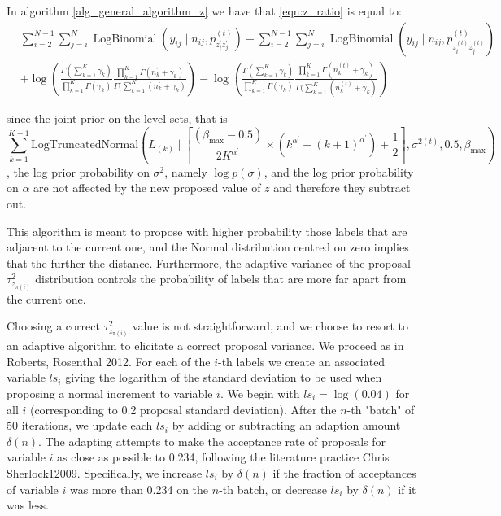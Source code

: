 \documentclass[11pt]{amsart}
\begin{document}
In algorithm \eqref{alg_general_algorithm_z} we have that \eqref{eqn:z_ratio} is equal to:
\begin{align}
&\sum_{i =2 }^{N-1} \sum_{j =i}^{N} \operatorname{LogBinomial}\left(y_{ij} \mid n_{ij}, p^{(t)}_{z^{\prime}_i z^{\prime}_j} \right)- \sum_{i =2 }^{N-1} \sum_{j =i}^{N} \operatorname{LogBinomial}\left( y_{ij} \mid n_{ij}, p^{(t)}_{z^{(t)}_i z^{(t)}_j} \right) \\&+  \log{ \left(\frac{\Gamma(\sum_{k=1}^K \gamma_k)}{\prod_{k=1}^K \Gamma(\gamma_k)}\frac{\prod_{k=1}^K \Gamma(n^{\prime}_k+\gamma_k)}{\Gamma(\sum_{k=1}^K (n^{\prime}_k+\gamma_k)} \right) } 
- \log{\left( \frac{\Gamma(\sum_{k=1}^K \gamma_k)}{\prod_{k=1}^K \Gamma(\gamma_k)}\frac{\prod_{k=1}^K \Gamma(n^{(t)}_k+\gamma_k)}{\Gamma(\sum_{k=1}^K (n^{(t)}_k+\gamma_k)} \right)}
\end{align}

since the joint prior on the level sets, that is $$ \sum_{k=1}^{K-1} \text{LogTruncatedNormal} \left(L_{(k)} \mid  \left[ \frac{(\beta_{\max} - 0.5)}{2K^{\alpha^{\prime}}} \times  \left(  k^{\alpha^{\prime}} + (k+1)^{\alpha^{\prime}} \right) +\frac{1}{2} \right], \sigma^{2(t)}, 0.5, \beta_{\max}\right)$$, the log prior probability on $\sigma^2$, namely $\log{p\left(\sigma \right)}$, and the log prior probability on $\alpha$ are not affected by the new proposed value of $z$ and therefore they subtract out.

This algorithm is meant to propose with higher probability those labels that are adjacent to the current one, and the Normal distribution centred on zero implies that the further the distance. Furthermore, the adaptive variance of the proposal $\tau^2_{z_{\pi(i)}}$ distribution controls the probability of labels that are more far apart from the current one.  

Choosing a correct $\tau^2_{z_{\pi(i)}}$ value is not straightforward, and we choose to resort to an adaptive algorithm to elicitate a correct proposal variance. We proceed as in Roberts, Rosenthal 2012. For each of the $i$-th labels we create an associated variable \(ls_i\) giving the logarithm of the standard deviation to be used when proposing a normal increment to variable \(i\). We begin with \(ls_i = \log{(0.04)}\) for all \(i\) (corresponding to 0.2 proposal standard deviation). After the \(n\)-th "batch" of 50 iterations, we update each \(ls_i\) by adding or subtracting an adaption amount \(\delta(n)\). The adapting attempts to make the acceptance rate of proposals for variable \(i\) as close as possible to 0.234, following the literature practice Chris Sherlock12009. Specifically, we increase \(ls_i\) by \(\delta(n)\) if the fraction of acceptances of variable \(i\) was more than 0.234 on the \(n\)-th batch, or decrease \(ls_i\) by \(\delta(n)\) if it was less.
\end{document}
